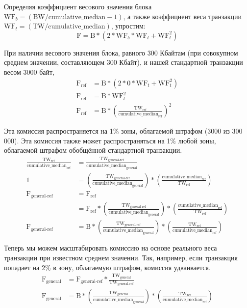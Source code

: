 Определяя коэффициент весового значения блока $\textrm{WF}_b = (\textrm{BW}/\textrm{cumulative\_median} - 1)$, а также коэффициент веса транзакции $\textrm{WF}_t = (\textrm{TW}/\textrm{cumulative\_median})$, упростим:\vspace{.175cm}
\[\textrm{F} = \textrm{B}*(2*\textrm{WF}_b*\textrm{WF}_t + \textrm{WF}_t^2)\]

При наличии весового значения блока, равного 300 Кбайтам (при совокупном среднем значе\-нии, составляющем 300 Кбайт), и нашей стандартной транзакции весом 3000 байт,
\begin{align*}
    \textrm{F}_{\textrm{ref}} &= \textrm{B}*(2*0*\textrm{WF}_t + \textrm{WF}_t^2)\\
    \textrm{F}_{\textrm{ref}} &= \textrm{B}*\textrm{WF}_t^2\\
    \textrm{F}_{\textrm{ref}} &= \textrm{B}*(\frac{\textrm{TW}_{\textrm{ref}}}{\textrm{cumulative\_median}_{\textrm{ref}}})^2
\end{align*}{}

Эта комиссия распространяется на 1\% зоны, облагаемой штрафом (3000 из 300 000). Эта комиссия также может распространяться на 1\% любой зоны, облагаемой штрафом обобщённой стандартной транзакции.\vspace{.175cm}
\begin{align*}
    \frac{\textrm{TW}_{\textrm{ref}}}{\textrm{cumulative\_median}_{\textrm{ref}}} &= \frac{\textrm{TW}_{\textrm{general-ref}}}{\textrm{cumulative\_median}_{\textrm{general}}}\\
    1 &= (\frac{\textrm{TW}_{\textrm{general-ref}}}{\textrm{cumulative\_median}_{\textrm{general}}}) * (\frac{\textrm{cumulative\_median}_{\textrm{ref}}}{\textrm{TW}_{\textrm{ref}}})\\
    \textrm{F}_{\textrm{general-ref}} &= \textrm{F}_{\textrm{ref}}\\
    &= \textrm{F}_{\textrm{ref}}*(\frac{\textrm{TW}_{\textrm{general-ref}}}{\textrm{cumulative\_median}_{\textrm{general}}}) * (\frac{\textrm{cumulative\_median}_{\textrm{ref}}}{\textrm{TW}_{\textrm{ref}}})\\
    \textrm{F}_{\textrm{general-ref}} &= \textrm{B}*(\frac{\textrm{TW}_{\textrm{general-ref}}}{\textrm{cumulative\_median}_{\textrm{general}}}) * (\frac{\textrm{TW}_{\textrm{ref}}}{\textrm{cumulative\_median}_{\textrm{ref}}})
\end{align*}{}

Теперь мы можем масштабировать комиссию на основе реального веса транзакции при извест\-ном среднем значении. Так, например, если транзакция попадает на 2\% в зону, облагаемую штрафом, комиссия удваивается.\vspace{.175cm}
\begin{align*}
    \textrm{F}_{\textrm{general}} &= \textrm{F}_{\textrm{general-ref}} * \frac{\textrm{TW}_{\textrm{general}}}{\textrm{TW}_{\textrm{general-ref}}}\\
    \textrm{F}_{\textrm{general}} &= \textrm{B}*(\frac{\textrm{TW}_{\textrm{general}}}{\textrm{cumulative\_median}_{\textrm{general}}}) * (\frac{\textrm{TW}_{\textrm{ref}}}{\textrm{cumulative\_median}_{\textrm{ref}}})
\end{align*}{}

